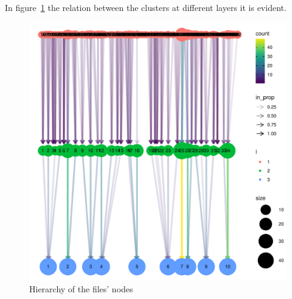In figure~\ref{fig:topic/gtex/oversigma_10tissue/bipartite_rebuild} the relation between the clusters at different layers it is evident.
\begin{figure}[htb!]
    \centering
    \includegraphics[width=0.8\linewidth]{pictures/topic/gtex/oversigma_10tissue/bipartite_rebuild.pdf}
    \caption{Hierarchy of the files' nodes}
    \label{fig:topic/gtex/oversigma_10tissue/bipartite_rebuild}
\end{figure}

\clearpage

